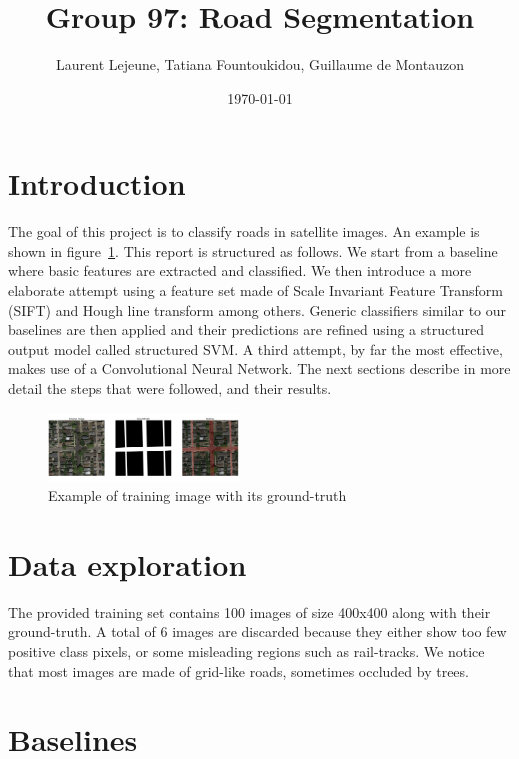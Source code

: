 \documentclass[10pt,conference,compsocconf]{IEEEtran}
\author{Laurent Lejeune, Tatiana Fountoukidou, Guillaume de Montauzon}
\date{\today}
\title{Group 97: Road Segmentation}
\begin{document}
	
\maketitle
	
\section{Introduction}
  The goal of this project is to classify roads in satellite images. An example is shown in figure~\ref{fig:example}. This report is structured as
  follows. We start from a baseline where basic features are extracted and classified. We then introduce a more elaborate attempt using a feature set made of Scale Invariant Feature Transform (SIFT) and Hough line transform among others. Generic classifiers similar to our baselines are then applied and their predictions are refined using a structured output model called
  structured SVM. A third attempt, by far the most effective, makes use of a Convolutional Neural Network. The next sections describe in more detail the steps that were followed, and their results. 
	\begin{figure}[h]
		\centering
		\includegraphics[width=0.45\textwidth]{example.png}
		\caption{Example of training image with its ground-truth}
		\label{fig:example}
	\end{figure}
	
\section{Data exploration}
	The provided training set contains 100 images of size 400x400 along with their
  ground-truth. A total of 6 images are discarded because they either show too few positive class pixels, or some misleading regions such as rail-tracks. 
	We notice that most images are made of grid-like roads, sometimes occluded by trees. 

\section{Baselines}
\end{document}

